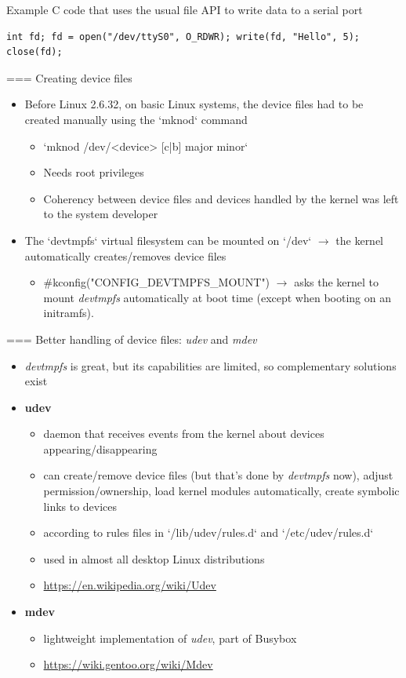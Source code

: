 Example C code that uses the usual file API to write data to a serial port

\small
\begin{verbatim}
int fd; fd = open("/dev/ttyS0", O_RDWR); write(fd, "Hello", 5); close(fd);
\end{verbatim}


=== {Creating device files}
  \begin{itemize}
    \item Before Linux 2.6.32, on basic Linux systems,
    the device files had to be created manually using the
    `mknod` command
    \begin{itemize}
    \item `mknod /dev/<device> [c|b] major minor`
    \item Needs root privileges
    \item Coherency between device files and devices handled by the
      kernel was left to the system developer
    \end{itemize}
  \item The `devtmpfs` virtual filesystem can be mounted on
    `/dev` $\rightarrow$ the kernel automatically creates/removes
    device files
    \begin{itemize}
    \item #kconfig("CONFIG_DEVTMPFS_MOUNT") $\rightarrow$ asks the
      kernel to mount {\em devtmpfs} automatically at boot time
      (except when booting on an initramfs).
    \end{itemize}
  \end{itemize}


=== {Better handling of device files: {\em udev} and {\em mdev}}
  \begin{itemize}
  \item {\em devtmpfs} is great, but its capabilities are limited, so
    complementary solutions exist
  \item {\bf udev}
    \begin{itemize}
    \item daemon that receives events from the kernel about devices
      appearing/disappearing
    \item can create/remove device files (but that's done by
      {\em devtmpfs} now), adjust permission/ownership,
      load kernel modules automatically, create symbolic links to
      devices
    \item according to rules files in `/lib/udev/rules.d` and
      `/etc/udev/rules.d`
    \item used in almost all desktop Linux distributions
    \item \url{https://en.wikipedia.org/wiki/Udev}
    \end{itemize}
  \item {\bf mdev}
    \begin{itemize}
    \item lightweight implementation of {\em udev}, part of Busybox
    \item \url{https://wiki.gentoo.org/wiki/Mdev}
    \end{itemize}
  \end{itemize}


